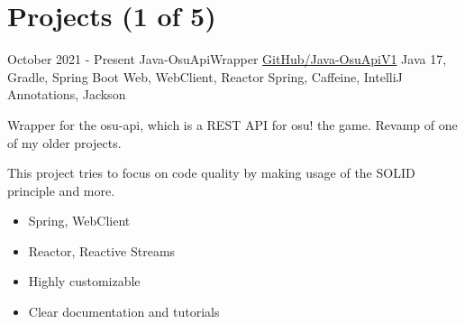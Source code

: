 \documentclass[letterpaper]{twentysecondcv} %
\begin{document}
\section{Projects (1 of 5)}
\begin{twenty} %
	\twentyitem
    		{October 2021 -}
		{Present}
        		{Java-OsuApiWrapper}
        		{\href{https://github.com/Tais993/Java-OsuApiV1/}{GitHub/Java-OsuApiV1}}
        		{Java 17, Gradle, Spring Boot Web, WebClient, Reactor Spring, Caffeine, IntelliJ Annotations, Jackson}
        		{
				Wrapper for the osu-api, which is a REST API for osu! the game.
				Revamp of one of my older projects.

				This project tries to focus on code quality by making usage of the SOLID principle and more.
        		\begin{itemize}
        		    \item Spring, WebClient
        		    \item Reactor, Reactive Streams
        		    \item Highly customizable
					\item Clear documentation and tutorials
                \end{itemize}}\\
\end{twenty}

\newpage

\makesidebarSecond %

\end{document}
